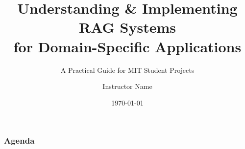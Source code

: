 \documentclass{beamer}
\title{Understanding \& Implementing RAG Systems\\for Domain-Specific Applications}
\subtitle{A Practical Guide for MIT Student Projects}
\author{Instructor Name}
\date{\today}
\begin{document}
\begin{frame}
    \titlepage
\end{frame}

\begin{frame}
    \frametitle{Agenda}
    \tableofcontents
\end{frame}

\studentunderstandingframe
\practicalimplementationframe
\conclusionframe
\end{document}
